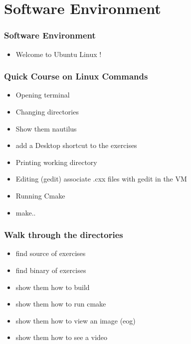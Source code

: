 \section{Software Environment}


\begin{frame}
\frametitle{Software Environment}
\begin{itemize}
\item Welcome to Ubuntu Linux !
\end{itemize}
\end{frame}


\begin{frame}
\frametitle{Quick Course on Linux Commands}
\begin{itemize}
\item Opening terminal
\item Changing directories
\item Show them nautilus 
\item add a Desktop shortcut to the exercises
\item Printing working directory
\item Editing (gedit) associate .cxx files with gedit in the VM
\item Running Cmake
\item make..
\end{itemize}
\end{frame}


\begin{frame}
\frametitle{Walk through the directories}
\begin{itemize}
\item find source of exercises
\item find binary of exercises
\item show them how to build
\item show them how to run cmake
\item show them how to view an image (eog)
\item show them how to see a video
\end{itemize}
\end{frame}
